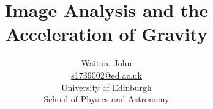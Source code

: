 \author{Waiton, John \\ \href{mailto:s1739002@ed.ac.uk}{s1739002@ed.ac.uk} \\ 
University of Edinburgh \\ 
School of Physics and Astronomy
}
\title{Image Analysis and the Acceleration of Gravity }
\date{\vspace{-3ex}}